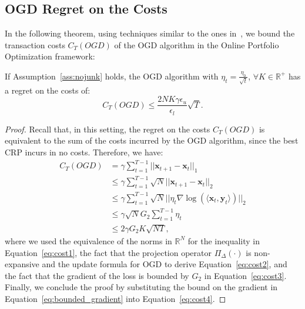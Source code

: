 \subsection{OGD Regret on the Costs}
In the following theorem, using techniques similar to the ones in~\cite{andrew2013tale}, we bound the transaction costs $C_T(OGD)$ of the OGD algorithm in the Online Portfolio Optimization framework:
\begin{theorem}\label{th:tc_ogd}
    If Assumption~\ref{ass:nojunk} holds, the OGD algorithm with $\eta_t = \frac{\eta_0}{\sqrt{t}}$,  $\forall K \in \mathbb{R}^+$ has a regret on the costs of:
    \begin{equation*}
        C_T(OGD) \leq \frac{2 N K \gamma \epsilon_u}{\epsilon_l} \sqrt{T}.
    \end{equation*}
\end{theorem}

\begin{proof}
Recall that, in this setting, the regret on the costs $C_T(OGD)$ is equivalent to the sum of the costs incurred by the OGD algorithm, since the best CRP incurs in no costs.
Therefore, we have:
\begin{align}
    C_T(OGD) & = \gamma \sum\limits_{t=1}^{T-1} ||\mathbf{x}_{t+1} - \mathbf{x}_{t}||_1 \\
    & \leq \gamma\sum\limits_{t=1}^{T-1} \sqrt{N} ||\mathbf{x}_{t+1} - \mathbf{x}_{t}||_2 \label{eq:cost1}\\
    & \leq \gamma\sum\limits_{t=1}^{T-1}\sqrt{N}|| \eta_t \nabla \log( \langle \mathbf{x}_t, \mathbf{y}_t \rangle)||_2 \label{eq:cost2}\\
    &\leq \gamma\sqrt{N} G_2 \sum\limits_{t=1}^{T-1} \eta_t \label{eq:cost3}\\
    & \leq 2\gamma G_2K\sqrt{NT}, \label{eq:cost4}
\end{align}
where we used the equivalence of the norms in $\mathbb{R}^N$ for the inequality in Equation~\eqref{eq:cost1}, the fact that the projection operator $\Pi_{\Delta}(\cdot)$ is non-expansive and the update formula for OGD to derive Equation~\eqref{eq:cost2}, and the fact that the gradient of the loss is bounded by $G_2$ in Equation~\eqref{eq:cost3}. 
Finally, we conclude the proof by substituting the bound on the gradient in Equation~\eqref{eq:bounded_gradient} into Equation~\eqref{eq:cost4}.
\end{proof}

